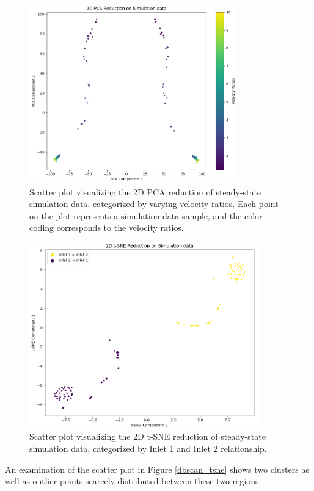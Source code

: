 \begin{figure}[ht]
    \centering
    \includegraphics[width=9cm]{images/Clustering/pca_sim_cmap.png}
    \caption{Scatter plot visualizing the 2D PCA reduction of steady-state simulation data, categorized by varying velocity ratios. Each point on the plot represents a simulation data sample, and the color coding corresponds to the velocity ratios. }
    \label{pca_sim}
    \end{figure}
\begin{figure}[ht]
    \centering
    \includegraphics[width=10cm]{images/Clustering/tsne_inlet_cmp.png}
    \caption{Scatter plot visualizing the 2D t-SNE reduction of steady-state simulation data, categorized by Inlet 1 and Inlet 2 relationship.}
    \label{tsne_in}
    \end{figure}
An examination of the scatter plot in Figure \ref{dbscan_tsne} shows two clusters as well as outlier points scarcely distributed between these two regions:
